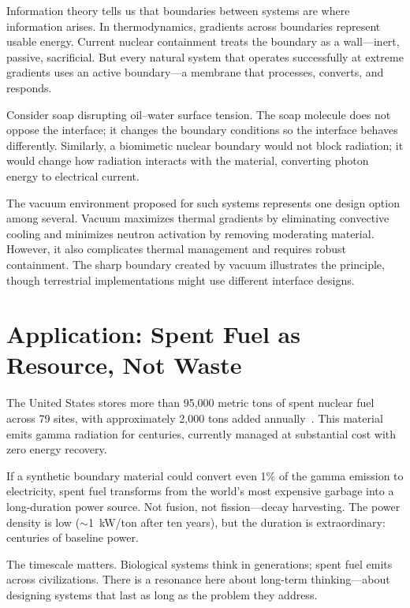 \documentclass[12pt]{article}
\begin{document}
Information theory tells us that boundaries between systems are where information arises.
In thermodynamics, gradients across boundaries represent usable energy. Current nuclear
containment treats the boundary as a wall---inert, passive, sacrificial. But every
natural system that operates successfully at extreme gradients uses an active
boundary---a membrane that processes, converts, and responds.

Consider soap disrupting oil--water surface tension. The soap molecule does not oppose
the interface; it changes the boundary conditions so the interface behaves differently.
Similarly, a biomimetic nuclear boundary would not block radiation; it would change how
radiation interacts with the material, converting photon energy to electrical current.

The vacuum environment proposed for such systems represents one design option among
several. Vacuum maximizes thermal gradients by eliminating convective cooling and
minimizes neutron activation by removing moderating material. However, it also
complicates thermal management and requires robust containment. The sharp boundary
created by vacuum illustrates the principle, though terrestrial implementations might
use different interface designs.

\section{Application: Spent Fuel as Resource, Not Waste}

The United States stores more than 95{,}000 metric tons of spent nuclear fuel across 79
sites, with approximately 2{,}000 tons added annually~\cite{doe2025}. This material emits
gamma radiation for centuries, currently managed at substantial cost with zero energy
recovery.

If a synthetic boundary material could convert even 1\% of the gamma emission to
electricity, spent fuel transforms from the world's most expensive garbage into a
long-duration power source. Not fusion, not fission---decay harvesting. The power density
is low ($\sim$1~kW/ton after ten years), but the duration is extraordinary: centuries of
baseline power.

The timescale matters. Biological systems think in generations; spent fuel emits across
civilizations. There is a resonance here about long-term thinking---about designing
systems that last as long as the problem they address.
\end{document}
